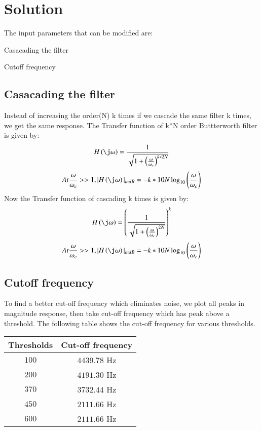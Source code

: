 \documentclass[journal,12pt,twocolumn]{IEEEtran}
\begin{document}
	\section{\textbf{Solution}}
	The input parameters that can be modified are:
	\begin{description}[font=$\bullet$\scshape\bfseries]
		\item[]{Casacading the filter}
		\item[]{Cutoff frequency}
		
	\end{description}
	
	\subsection{\textbf{Casacading the filter}}
	 Instead of increasing the order(N) k times if we cascade the same  filter k times, we get the same response.
	 The Transfer function of k*N order Buttterworth filter is given by:
	 \begin{align}
	 H\brak{\j\omega} = \frac{1}{\sqrt{1+\brak{\frac{\omega}{\omega_{c}}}^{k*2N}}}
	 \end{align}
	 \begin{align}
	 At \frac{\omega}{\omega_{c}}>>1, |H\brak{\j\omega}|_{in dB} = -k*10N\log_{10}\brak{\frac{\omega}{\omega_{c}}}
	 \end{align}
	 Now the Transfer function of cascading k times is given by:  
	 \begin{align}
	 H\brak{\j\omega} =  \brak{\frac{1}{\sqrt{1+\brak{\frac{\omega}{\omega_{c}}}^{2N}}}}^k
	 \end{align}
	 \begin{align}
      At \frac{\omega}{\omega_{c}}>>1, |H\brak{\j\omega}|_{in dB} = -k*10N\log_{10}\brak{\frac{\omega}{\omega_{c}}}
     \end{align}

	 
	 
	\subsection{\textbf{Cutoff frequency}}
	To find a better cut-off frequency which eliminates noise, we plot all peaks in magnitude response, then take cut-off frequency which has peak above a threshold.
	The following table shows the cut-off frequency for various thresholds.
	\begin{center}
		\begin{tabular}{ |c|c| } 
			\hline
			 Thresholds & Cut-off frequency \\
			\hline
			$100$ & $4439.78$ Hz\\
			\hline
			$200$ & $4191.30$ Hz\\
			\hline
			$370$ & $3732.44$ Hz\\
			\hline
			$450$ & $2111.66$ Hz\\
			\hline
			$600$ & $2111.66$ Hz\\
			\hline


		\end{tabular}
	\end{center} 
\end{document}
